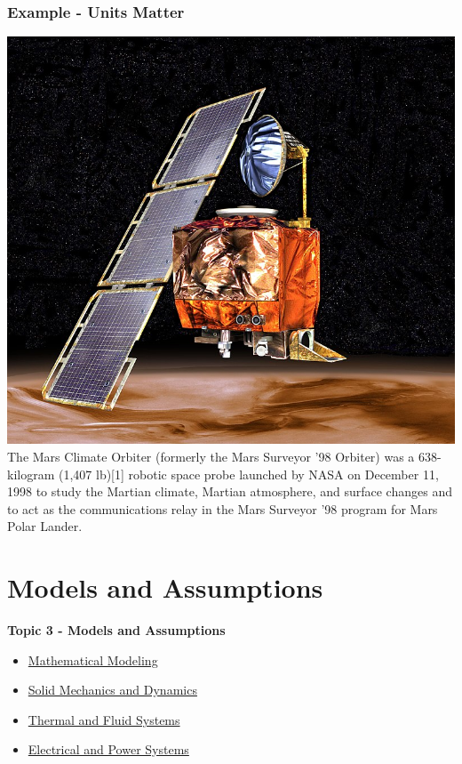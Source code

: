 \documentclass[fleqn]{beamer} %
\newcommand{\sectionIIItitle}{Models and Assumptions}
\newcommand{\sectionIIsubsectionIVtitle}{Example - Units Matter}
\newcommand{\sectionIIIsubsectionItitle}{Mathematical Modeling}
\newcommand{\sectionIIIsubsectionIItitle}{Solid Mechanics and Dynamics}
\newcommand{\sectionIIIsubsectionIIItitle}{Thermal and Fluid Systems}
\newcommand{\sectionIIIsubsectionIVtitle}{Electrical and Power Systems}
\begin{document}
			\begin{frame}
				\frametitle{\sectionIIsubsectionIVtitle}
				\bigskip
				\includegraphics[scale=.1]{images/mars_orbiter.jpg}
				The Mars Climate Orbiter (formerly the Mars Surveyor '98 Orbiter) was a 638-kilogram (1,407 lb)[1] robotic space probe launched by NASA on December 11, 1998 to study the Martian climate, Martian atmosphere, and surface changes and to act as the communications relay in the Mars Surveyor '98 program for Mars Polar Lander. 
		
			\end{frame}
		
	\section{\sectionIIItitle}\label{sectionIII}

		\begin{frame}
			\large \textbf{Topic 3 - \sectionIIItitle} \vspace{3mm}\\

			\begin{itemize}
				\item \hyperlink{sectionIIIsubsectionI}{\sectionIIIsubsectionItitle} \vspc %
				\item \hyperlink{sectionIIIsubsectionII}{\sectionIIIsubsectionIItitle} \vspc %
				\item \hyperlink{sectionIIIsubsectionIII}{\sectionIIIsubsectionIIItitle} \vspc %
				\item \hyperlink{sectionIIIsubsectionIV}{\sectionIIIsubsectionIVtitle} \vspc %
			\end{itemize}

		\end{frame}
\end{document}

